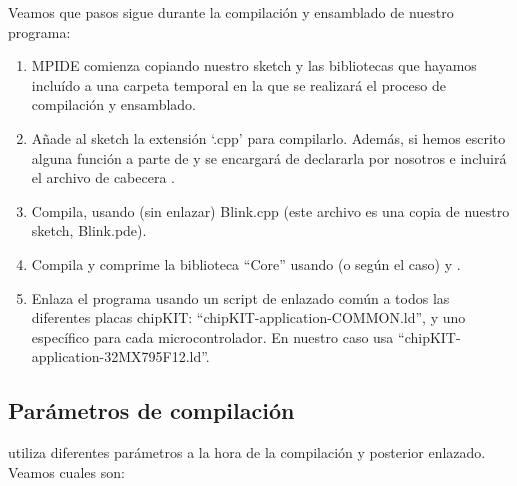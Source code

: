 Veamos que pasos sigue  durante la compilación y ensamblado de nuestro programa:
\begin{enumerate}
	\item MPIDE comienza copiando nuestro sketch y las bibliotecas que hayamos incluído a una carpeta temporal en la que se realizará el proceso de compilación y ensamblado.
	\item Añade al sketch la extensión `.cpp' para compilarlo. Además, si hemos escrito alguna función a parte de  y  se encargará de declararla por nosotros e incluirá el archivo de cabecera .
	\item Compila, usando  (sin enlazar) Blink.cpp (este archivo es una copia de nuestro sketch, Blink.pde).
	\item Compila y comprime la biblioteca ``Core'' usando  (o  según el caso) y .
	\item Enlaza el programa usando un script de enlazado común a todos las diferentes placas chipKIT: ``chipKIT-application-COMMON.ld'', y uno específico para cada microcontrolador. En nuestro caso usa ``chipKIT-application-32MX795F12.ld''.
\end{enumerate}

\subsection{Parámetros de compilación}
 utiliza diferentes parámetros a la hora de la compilación y posterior enlazado. Veamos cuales son:\\

